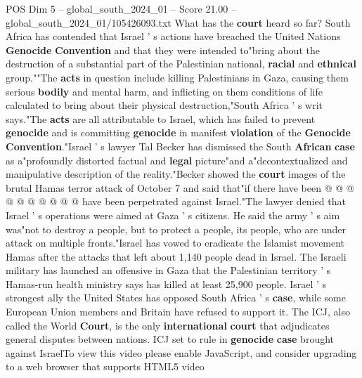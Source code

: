 \begin{textsample}{POS Dim 5 – global\_south\_2024\_01 – Score 21.00 – global\_south\_2024\_01/105426093.txt}
What has the \textbf{court} heard so far?
South Africa has contended that Israel ' s actions have breached the United Nations \textbf{Genocide} \textbf{Convention} and that they were intended to"bring about the destruction of a substantial part of the Palestinian national, \textbf{racial} and \textbf{ethnical} group.""The \textbf{acts} in question include killing Palestinians in Gaza, causing them serious \textbf{bodily} and mental harm, and inflicting on them conditions of life calculated to bring about their physical destruction,"South Africa ' s writ says."The \textbf{acts} are all attributable to Israel, which has failed to prevent \textbf{genocide} and is committing \textbf{genocide} in manifest \textbf{violation} of the \textbf{Genocide} \textbf{Convention}."Israel ' s lawyer Tal Becker has dismissed the South \textbf{African} \textbf{case} as a"profoundly distorted factual and \textbf{legal} picture"and a"decontextualized and manipulative description of the reality."Becker showed the \textbf{court} images of the brutal Hamas terror attack of October 7 and said that"if there have been @ @ @ @ @ @ @ @ @ @ have been perpetrated against Israel."The lawyer denied that Israel ' s operations were aimed at Gaza ' s citizens.
He said the army ' s aim was"not to destroy a people, but to protect a people, its people, who are under attack on multiple fronts."Israel has vowed to eradicate the Islamist movement Hamas after the attacks that left about 1,140 people dead in Israel.
The Israeli military has launched an offensive in Gaza that the Palestinian territory ' s Hamas-run health ministry says has killed at least 25,900 people.
Israel ' s strongest ally the United States has opposed South Africa ' s \textbf{case}, while some European Union members and Britain have refused to support it.
The ICJ, also called the World \textbf{Court}, is the only \textbf{international} \textbf{court} that adjudicates general disputes between nations.
ICJ set to rule in \textbf{genocide} \textbf{case} brought against IsraelTo view this video please enable JavaScript, and consider upgrading to a web browser that supports HTML5 video

\end{textsample}
